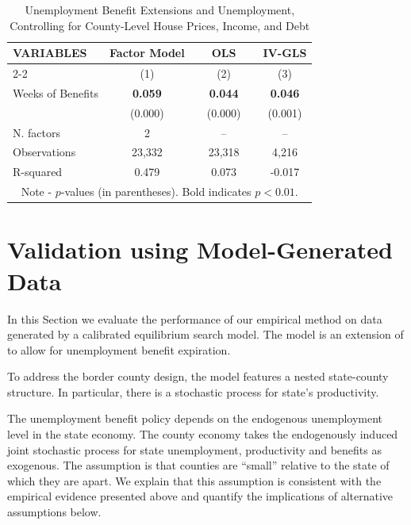 \documentclass[12pt]{article}
\newcommand{\1}{\mathbf{1}}
\begin{document}
\begin{appendix}
\begin{table}[H]
  \centering
	\captionsetup{justification=centering}
   \caption{Unemployment Benefit Extensions and Unemployment, \\ Controlling for County-Level House Prices, Income, and Debt} \label{tab:Endog_Vars}
\small
    \begin{tabular}{lccccc} \hline
    VARIABLES & Factor Model &&  OLS &&  IV-GLS \\ \cline{2-2} \cline{4-4} \cline{6-6}
    				  & (1) && (2) && (3) \\ \hline
Weeks of  Benefits & \bf{0.059} && \bf{0.044} && \bf{0.046} \\
									 & (0.000)	  && (0.000)	 	 &&  (0.001)\\

N. factors   & 2 && -- && --   \\
Observations & 23,332 && 23,318 && 4,216  \\
R-squared    & 0.479 && 0.073 && -0.017  \\ \hline
\multicolumn{6}{c}{\footnotesize Note - $p$-values (in parentheses). Bold indicates $p<0.01$.} \\
\end{tabular}
\vspace{-0.2cm}
\end{table}


\section{Validation using Model-Generated Data}
\label{sec:simulation}

In this Section we evaluate the performance of our empirical method on data generated by a calibrated equilibrium search model. The model is an extension of \citet{mortensen+pissarides:94} to allow for unemployment benefit expiration.

To address the border county design, the model features a nested state-county structure. In particular, there is a stochastic process for state's productivity.

 The unemployment benefit policy depends on the endogenous unemployment level in the state economy.  The county economy takes the endogenously induced joint stochastic process for state unemployment, productivity and benefits as exogenous. The assumption is that counties are ``small'' relative to the state of which they are apart. We explain that this assumption is consistent with the empirical evidence presented above and quantify the implications of alternative assumptions below.


\end{appendix}
\end{document}
